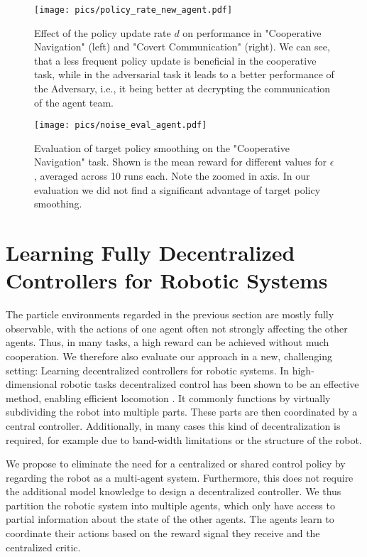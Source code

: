 \documentclass{article}
\begin{document}
\begin{figure}
	\begin{minipage}[t]{0.48\textwidth}
		\centering
		\texttt{[image: pics/policy\_rate\_new\_agent.pdf]}
		\caption{Effect of the policy update rate $d$ on performance in "Cooperative Navigation" (left) and "Covert Communication" (right). 
			We can see, that a less frequent policy update is beneficial in the cooperative task, while in the adversarial task it leads to a better performance of the Adversary, i.e., it being better at decrypting the communication of the agent team.}
		\label{fig:pol_rate}
	\end{minipage}
	\hfill
	\begin{minipage}[t]{0.48\textwidth}
		\texttt{[image: pics/noise\_eval\_agent.pdf]}
		\centering
		\caption{Evaluation of target policy smoothing on the "Cooperative Navigation" task. Shown is the mean reward for different values for $\epsilon$, averaged across 10 runs each. Note the zoomed in axis. In our evaluation we did not find a significant advantage of target policy smoothing.}
		\label{fig:target_policy_smoothing}
		\vspace{-0.5cm}
	\end{minipage}
\end{figure}
\vspace{-1.5mm}
\section{Learning Fully Decentralized Controllers for Robotic Systems}
\vspace{-1.5mm}
\label{sec:robot-decentral}
The particle environments regarded in the previous section are mostly fully observable, with the actions of one agent often not strongly affecting the other agents.
Thus, in many tasks, a high reward can be achieved without much cooperation.
We therefore also evaluate our approach in a new, challenging setting: Learning decentralized controllers for robotic systems.
In high-dimensional robotic tasks decentralized control has been shown to be an effective method, enabling efficient locomotion \cite{Whitman2016}. 
It commonly functions by virtually subdividing the robot into multiple parts. 
These parts are then coordinated by a central controller.
Additionally, in many cases this kind of decentralization is required, for example due to band-width limitations or the structure of the robot.

We propose to eliminate the need for a centralized or shared control policy by regarding the robot as a multi-agent system.
Furthermore, this does not require the additional model knowledge to design a decentralized controller.
We thus partition the robotic system into multiple agents, which only have access to partial information about the state of the other agents. 
The agents learn to coordinate their actions based on the reward signal they receive and the centralized critic.
\end{document}
